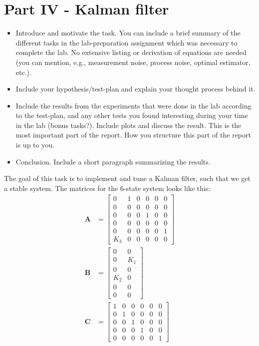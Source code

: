 \section{Part IV - Kalman filter}
\begin{itemize}
    \item Introduce and motivate the task. You can include a brief summary of the different tasks in the lab-preparation assignment which was necessary to complete the lab. No extensive listing or derivation of equations are needed (you can mention, e.g., measurement noise, process noise, optimal estimator, etc.). 
    \item Include your hypothesis/test-plan and explain your thought process behind it.
    \item Include the results from the experiments that were done in the lab according to the test-plan, and any other tests you found interesting during your time in the lab (bonus tasks?). Include plots and discuss the result. This is the most important part of the report. How you structure this part of the report is up to you. 
    \item Conclusion. Include a short paragraph summarizing the results. 
\end{itemize}

The goal of this task is to implement and tune a Kalman filter, such that we get a stable system.
The matrices for the 6-state system looks like this:
\begin{equation}
    \begin{aligned}
        \mathbf{A}&=
        \begin{bmatrix}
            0 & 1 & 0 & 0 & 0 &0 \\
            0 & 0 & 0 & 0 & 0 & 0\\
            0 & 0 & 0 & 1 & 0 & 0\\
            0 & 0 & 0 & 0 & 0 & 0\\
            0 & 0 & 0 & 0 & 0 & 1\\
            K_3 & 0 & 0 & 0 & 0 & 0
        \end{bmatrix}\\
        \mathbf{B}&=
        \begin{bmatrix}
            0 & 0 \\
            0 & K_1 \\
            0 & 0 \\
            K_2 & 0 \\
            0 & 0 \\
            0 & 0
        \end{bmatrix}\\
        \mathbf{C}&=
        \begin{bmatrix}
            1 & 0 & 0 & 0 & 0 & 0 \\
            0 & 1 & 0 & 0 & 0 & 0\\
            0 & 0 & 1 & 0 & 0 & 0\\
            0 & 0 & 0 & 1 & 0 & 0\\
            0 & 0 & 0 & 0 & 0 & 1
        \end{bmatrix}\\
    \end{aligned}
\end{equation}

